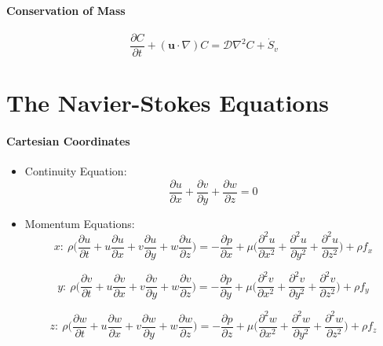 \documentclass[a4paper]{article}
\begin{document}
\paragraph{Conservation of Mass}
\[
    \frac{\partial C}{\partial t} + (\mathbf{u} \cdot \nabla)C = \mathcal{D}\nabla^2 C + \dot{S}_{v}
\]

\section{The Navier-Stokes Equations}
    \paragraph{Cartesian Coordinates} 
        \begin{itemize}
            \item Continuity Equation:
            \[\frac{\partial u}{\partial x} + \frac{\partial v}{\partial y} + \frac{\partial w}{\partial z}=0\]
            
            \item Momentum Equations:
            \[x: \ \rho \bigg(\frac{\partial u}{\partial t} + u \frac{\partial u}{\partial x} + v\frac{\partial u}{\partial y} + w\frac{\partial u}{\partial z} \bigg) = -\frac{\partial p}{\partial x} + \mu \bigg(\frac{\partial^{2} u}{\partial x^{2}} + \frac{\partial^{2} u}{\partial y^{2}} + \frac{\partial^{2} u}{\partial z^{2}}\bigg) + \rho f_{x}\]
            
            \[y: \ \rho \bigg(\frac{\partial v}{\partial t} + u \frac{\partial v}{\partial x} + v\frac{\partial v}{\partial y} + w\frac{\partial v}{\partial z} \bigg) = -\frac{\partial p}{\partial y} + \mu \bigg(\frac{\partial^{2} v}{\partial x^{2}} + \frac{\partial^{2} v}{\partial y^{2}} + \frac{\partial^{2} v}{\partial z^{2}}\bigg) + \rho f_{y}\]
            
            \[z: \ \rho \bigg(\frac{\partial w}{\partial t} + u \frac{\partial w}{\partial x} + v\frac{\partial w}{\partial y} + w\frac{\partial w}{\partial z} \bigg) = -\frac{\partial p}{\partial z} + \mu \bigg(\frac{\partial^{2} w}{\partial x^{2}} + \frac{\partial^{2} w}{\partial y^{2}} + \frac{\partial^{2} w}{\partial z^{2}}\bigg) + \rho f_{z}\]
            
        \end{itemize}
    
\end{document}
